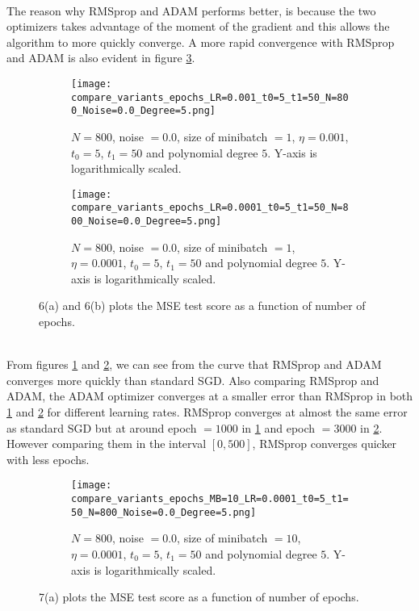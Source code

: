 \documentclass[a4paper,twocolumn]{article}
\begin{document}
\\
The reason why RMSprop and ADAM performs better, is because the two optimizers takes advantage of the moment of the gradient and this allows the algorithm to more quickly converge. A more rapid convergence with RMSprop and ADAM is also evident in figure \ref{fig:6}.
\begin{figure}[ht]
    \centering
    \begin{subfigure}[b]{0.87\columnwidth}
        \texttt{[image: compare\_variants\_epochs\_LR=0.001\_t0=5\_t1=50\_N=800\_Noise=0.0\_Degree=5.png]}
        \caption{$N = 800$, noise $= 0.0$, size of minibatch $= 1$, $\eta = 0.001$, $t_{0} = 5$, $t_{1} = 50$ and polynomial degree $5$. Y-axis is logarithmically scaled.}
        \label{fig:6a}
    \end{subfigure}
    
    \begin{subfigure}[b]{0.87\columnwidth}
        \texttt{[image: compare\_variants\_epochs\_LR=0.0001\_t0=5\_t1=50\_N=800\_Noise=0.0\_Degree=5.png]}
        \caption{$N = 800$, noise $= 0.0$, size of minibatch $= 1$, $\eta = 0.0001$, $t_{0} = 5$, $t_{1} = 50$ and polynomial degree $5$. Y-axis is logarithmically scaled.}
        \label{fig:6b}
    \end{subfigure}
    \caption{6(a) and 6(b) plots the MSE test score as a function of number of epochs.}
    \label{fig:6}
\end{figure}\\
From figures \ref{fig:6a} and \ref{fig:6b}, we can see from the curve that RMSprop and ADAM converges more quickly than standard SGD. Also comparing RMSprop and ADAM, the ADAM optimizer converges at a smaller error than RMSprop in both \ref{fig:6a} and \ref{fig:6b} for different learning rates. RMSprop converges at almost the same error as standard SGD but at around epoch $= 1000$ in \ref{fig:6a} and epoch $= 3000$ in \ref{fig:6b}. However comparing them in the interval $[0, 500]$, RMSprop converges quicker with less epochs.
\begin{figure}[ht]
    \centering
    \begin{subfigure}[b]{\columnwidth}
        \texttt{[image: compare\_variants\_epochs\_MB=10\_LR=0.0001\_t0=5\_t1=50\_N=800\_Noise=0.0\_Degree=5.png]}
        \caption{$N = 800$, noise $= 0.0$, size of minibatch $= 10$, $\eta = 0.0001$, $t_{0} = 5$, $t_{1} = 50$ and polynomial degree $5$. Y-axis is logarithmically scaled.}
    \end{subfigure}
    \caption{7(a) plots the MSE test score as a function of number of epochs.}
    \label{fig:7}
\end{figure}\\
\end{document}
